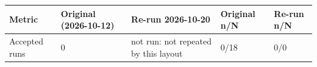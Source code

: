 \begin{tabular}{@{}lllll@{}}
\toprule
Metric & Original (2026-10-12) & Re-run 2026-10-20 & Original n/N & Re-run n/N \\
\midrule
Accepted runs & 0 & not run: not repeated by this layout & 0/18 & 0/0 \\
\bottomrule
\end{tabular}

